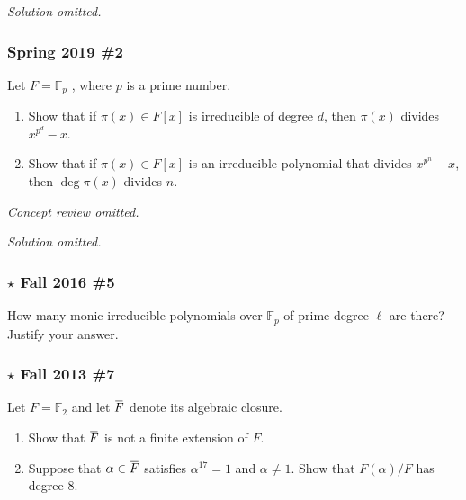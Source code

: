 \emph{Solution omitted.}

\hypertarget{spring-2019-2}{%
\subsubsection{Spring 2019 \#2}\label{spring-2019-2}}

Let \(F = {\mathbb{F}}_p\) , where \(p\) is a prime number.

\begin{enumerate}
\def\labelenumi{\alph{enumi}.}
\item
  Show that if \(\pi(x) \in F[x]\) is irreducible of degree \(d\), then
  \(\pi(x)\) divides \(x^{p^d} - x\).
\item
  Show that if \(\pi(x) \in F[x]\) is an irreducible polynomial that
  divides \(x^{p^n} - x\), then \(\deg \pi(x)\) divides \(n\).
\end{enumerate}

\emph{Concept review omitted.}

\emph{Solution omitted.}

\hypertarget{star-fall-2016-5}{%
\subsubsection{\texorpdfstring{\(\star\) Fall 2016
\#5}{\textbackslash star Fall 2016 \#5}}\label{star-fall-2016-5}}

How many monic irreducible polynomials over \({\mathbb{F}}_p\) of prime
degree \(\ell\) are there? Justify your answer.

\hypertarget{star-fall-2013-7}{%
\subsubsection{\texorpdfstring{\(\star\) Fall 2013
\#7}{\textbackslash star Fall 2013 \#7}}\label{star-fall-2013-7}}

Let \(F = {\mathbb{F}}_2\) and let
\(\mkern 1.5mu\overline{\mkern-1.5muF\mkern-1.5mu}\mkern 1.5mu\) denote
its algebraic closure.

\begin{enumerate}
\def\labelenumi{\alph{enumi}.}
\item
  Show that
  \(\mkern 1.5mu\overline{\mkern-1.5muF\mkern-1.5mu}\mkern 1.5mu\) is
  not a finite extension of \(F\).
\item
  Suppose that
  \(\alpha \in \mkern 1.5mu\overline{\mkern-1.5muF\mkern-1.5mu}\mkern 1.5mu\)
  satisfies \(\alpha^{17} = 1\) and \(\alpha\neq 1\). Show that
  \(F(\alpha)/F\) has degree 8.
\end{enumerate}

